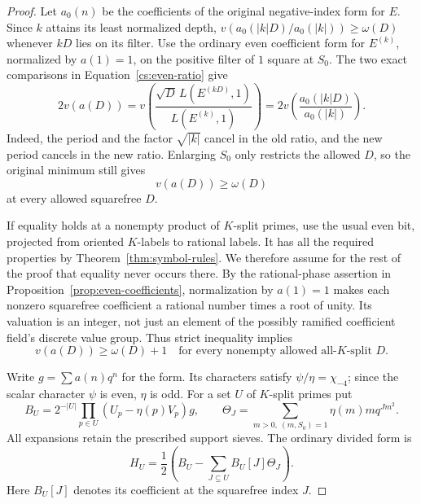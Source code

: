 \begin{proof}
Let $a_0(n)$ be the coefficients of the original negative-index form for
$E$.  Since $k$ attains its least normalized depth,
$v(a_0(|k|D)/a_0(|k|))\ge\omega(D)$ whenever $kD$ lies on its filter.
Use the ordinary even coefficient form for $E^{(k)}$, normalized by
$a(1)=1$, on the positive filter of $1$ square at $S_0$.
The two exact comparisons in Equation~\eqref{cs:even-ratio} give
\[
 2v(a(D))
 =v\!\left(\frac{\sqrt D\,L(E^{(kD)},1)}{L(E^{(k)},1)}\right)
 =2v\!\left(\frac{a_0(|k|D)}{a_0(|k|)}\right).
\]
Indeed, the period and the factor $\sqrt{|k|}$ cancel in the old ratio,
and the new period cancels in the new ratio.  Enlarging $S_0$ only
restricts the allowed $D$, so the original minimum still gives
\begin{equation}\label{pw:split-basic-depth}
 v(a(D))\ge\omega(D)
\end{equation}
at every allowed squarefree $D$.

If equality holds at a nonempty product of $K$-split primes, use the usual
even bit, projected from oriented $K$-labels to rational labels.  It has
all the required properties by Theorem~\ref{thm:symbol-rules}.  We
therefore assume for the rest of the proof that equality never occurs
there.  By the rational-phase assertion in Proposition~\ref{prop:even-coefficients},
normalization by $a(1)=1$ makes each nonzero squarefree coefficient a
rational number times a root of unity.  Its valuation is an integer,
not just an element of the possibly ramified coefficient field's
discrete value group.  Thus strict inequality implies
\begin{equation}\label{pw:split-extra-depth}
 v(a(D))\ge\omega(D)+1
 \quad\text{for every nonempty allowed all-$K$-split }D.
\end{equation}

Write $g=\sum a(n)q^n$ for the form.  Its characters satisfy
$\psi/\eta=\chi_{-4}$; since the scalar character $\psi$ is even,
$\eta$ is odd.  For a set $U$ of $K$-split
primes put
\[
 B_U=2^{-|U|}\prod_{p\in U}(U_p-\eta(p)V_p)g,
 \qquad
 \Theta_J=\sum_{m>0,\ (m,S_0)=1}\eta(m)m q^{Jm^2}.
\]
All expansions retain the prescribed support sieves.  The ordinary divided
form is
\[
 H_U=\frac12\left(B_U-\sum_{J\subseteq U}B_U[J]\Theta_J\right).
\]
Here $B_U[J]$ denotes its coefficient at the squarefree index $J$.


\end{proof}
